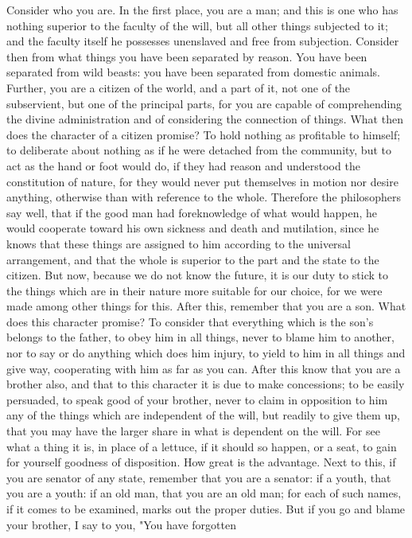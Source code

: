 \documentclass[a4paper]{article}
\begin{document}
    Consider who you are. In the first place, you are a man; and this is one
who has nothing superior to the faculty of the will, but all other things
subjected to it; and the faculty itself he possesses unenslaved and free from
subjection. Consider then from what things you have been separated by reason.
You have been separated from wild beasts: you have been separated from domestic
animals. Further, you are a citizen of the world, and a part of it, not one of
the subservient, but one of the principal parts, for you are capable of
comprehending the divine administration and of considering the connection of
things. What then does the character of a citizen promise? To hold nothing as
profitable to himself; to deliberate about nothing as if he were detached from
the community, but to act as the hand or foot would do, if they had reason and
understood the constitution of nature, for they would never put themselves in
motion nor desire anything, otherwise than with reference to the whole.
Therefore the philosophers say well, that if the good man had foreknowledge of
what would happen, he would cooperate toward his own sickness and death and
mutilation, since he knows that these things are assigned to him according to
the universal arrangement, and that the whole is superior to the part and the
state to the citizen. But now, because we do not know the future, it is our
duty to stick to the things which are in their nature more suitable for our
choice, for we were made among other things for this.
    After this, remember that you are a son. What does this character promise?
To consider that everything which is the son's belongs to the father, to obey
him in all things, never to blame him to another, nor to say or do anything
which does him injury, to yield to him in all things and give way, cooperating
with him as far as you can. After this know that you are a brother also, and
that to this character it is due to make concessions; to be easily persuaded,
to speak good of your brother, never to claim in opposition to him any of the
things which are independent of the will, but readily to give them up, that you
may have the larger share in what is dependent on the will. For see what a
thing it is, in place of a lettuce, if it should so happen, or a seat, to gain
for yourself goodness of disposition. How great is the advantage.
    Next to this, if you are senator of any state, remember that you are a
senator: if a youth, that you are a youth: if an old man, that you are an old
man; for each of such names, if it comes to be examined, marks out the proper
duties. But if you go and blame your brother, I say to you, "You have forgotten
\end{document}
